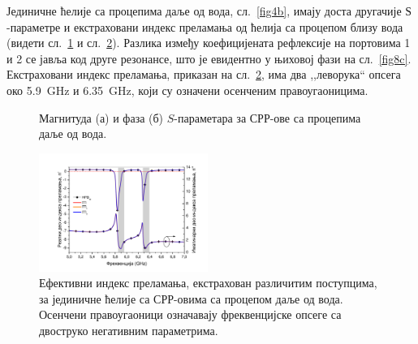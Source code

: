 \documentclass[main.tex]{subfiles}
\begin{document}
Јединичне ћелије са процепима даље од вода, сл.~\ref{fig4b}, имају доста другачије $Ѕ$-параметре и екстраховани индекс преламања од ћелија са процепом близу вода (видети сл.~\ref{fig8} и сл.~\ref{fig8b}). Разлика између коефицијената рефлексије на портовима 1 и 2 се јавља код друге резонансе, што је евидентно у њиховој фази на сл.~\ref{fig8c}. Екстраховани индекс преламања, приказан на сл.~\ref{fig8b}, има два ,,леворука`` опсега око \SI{5.9}{\giga\hertz} и \SI{6.35}{\giga\hertz}, који су означени осенченим правоугаоницима.
\begin{figure}[!t]
\hfill
{}
\caption{Магнитуда (а) и фаза (б) $S$-параметара за СРР-ове са процепима даље од вода.}
\label{fig8}
\end{figure}
\begin{figure}[!t]
\centering
\includegraphics[trim={2cm 0 1.5cm 0}, clip, width=0.49\textwidth]{slike/8b.pdf}
\caption{Ефективни индекс преламања, екстрахован различитим поступцима, за јединичне ћелије са СРР-овима са процепом даље од вода. Осенчени правоугаоници означавају фреквенцијске опсеге са двоструко негативним параметрима.}
\label{fig8b}
\end{figure} 
\end{document}
